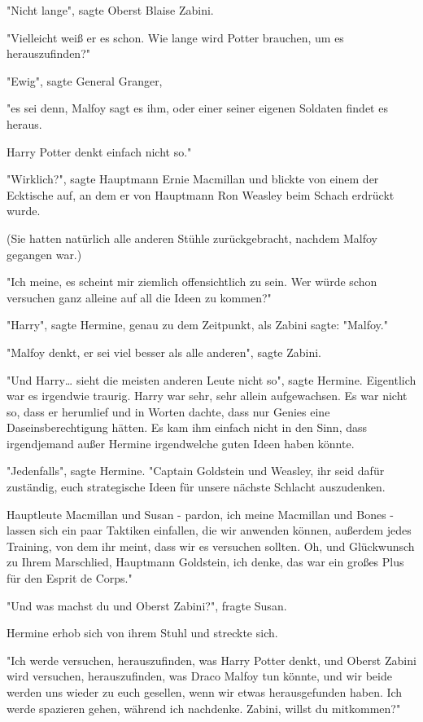 {"Nicht lange", sagte Oberst Blaise Zabini.

"Vielleicht weiß er es schon. Wie lange wird Potter brauchen, um es herauszufinden?"

"Ewig", sagte General Granger,

"es sei denn, Malfoy sagt es ihm, oder einer seiner eigenen Soldaten findet es heraus.

Harry Potter denkt einfach nicht so."

"Wirklich?", sagte Hauptmann Ernie Macmillan und blickte von einem der Ecktische auf, an dem er von Hauptmann Ron Weasley beim Schach erdrückt wurde.

(Sie hatten natürlich alle anderen Stühle zurückgebracht, nachdem Malfoy gegangen war.)

"Ich meine, es scheint mir ziemlich offensichtlich zu sein. Wer würde schon versuchen ganz alleine auf all die Ideen zu kommen?"

"Harry", sagte Hermine, genau zu dem Zeitpunkt, als Zabini sagte: "Malfoy."

"Malfoy denkt, er sei viel besser als alle anderen", sagte Zabini.

"Und Harry… sieht die meisten anderen Leute nicht so", sagte Hermine. Eigentlich war es irgendwie traurig. Harry war sehr, sehr allein aufgewachsen. Es war nicht so, dass er herumlief und in Worten dachte, dass nur Genies eine Daseinsberechtigung hätten. Es kam ihm einfach nicht in den Sinn, dass irgendjemand außer Hermine irgendwelche guten Ideen haben könnte.

"Jedenfalls", sagte Hermine. "Captain Goldstein und Weasley, ihr seid dafür zuständig, euch strategische Ideen für unsere nächste Schlacht auszudenken.

Hauptleute Macmillan und Susan - pardon, ich meine Macmillan und Bones - lassen sich ein paar Taktiken einfallen, die wir anwenden können, außerdem jedes Training, von dem ihr meint, dass wir es versuchen sollten. Oh, und Glückwunsch zu Ihrem Marschlied, Hauptmann Goldstein, ich denke, das war ein großes Plus für den Esprit de Corps."

"Und was machst du und Oberst Zabini?", fragte Susan.

Hermine erhob sich von ihrem Stuhl und streckte sich.

"Ich werde versuchen, herauszufinden, was Harry Potter denkt, und Oberst Zabini wird versuchen, herauszufinden, was Draco Malfoy tun könnte, und wir beide werden uns wieder zu euch gesellen, wenn wir etwas herausgefunden haben. Ich werde spazieren gehen, während ich nachdenke. Zabini, willst du mitkommen?"

}
